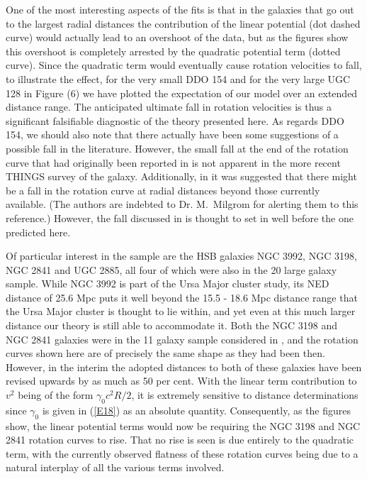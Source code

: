 \documentclass[preprint,aps]{revtex4}
\begin{document}
One of the most interesting aspects  of the fits is that in the galaxies that go out to the largest radial distances the contribution of the linear potential (dot dashed curve) would actually lead to an overshoot of the data, but as the figures show this overshoot is completely arrested by the quadratic potential term (dotted curve). Since the quadratic term would eventually cause rotation velocities to fall, to illustrate the effect, for the very small DDO 154 and for the very large UGC 128  in Figure (6) we have plotted the expectation of our model over an extended distance range. The anticipated ultimate fall in rotation velocities is thus a significant falsifiable diagnostic of the theory presented here. As regards DDO 154, we should also note that there actually have been some suggestions of a possible fall in the literature. However, the small fall at the end of the rotation curve that had originally been reported in \cite{Carignan1989} is not apparent in the more recent THINGS survey of the galaxy. Additionally, in \cite{Hoffman1993} it was suggested that there might  be a fall in the rotation curve at radial distances beyond those currently available. (The authors are indebted to Dr. M.~Milgrom for alerting them to this reference.)  However, the fall discussed in \cite{Hoffman1993} is thought to set in well before the one predicted here.

Of particular interest in the sample are the HSB galaxies NGC 3992, NGC 3198, NGC 2841 and UGC 2885, all four of which were also in the 20 large galaxy sample. While NGC 3992 is part of the Ursa Major cluster study, its NED distance of 25.6 Mpc puts it well beyond the 15.5 - 18.6 Mpc distance range that the Ursa Major cluster is thought to lie within, and yet even at this much larger distance our theory is still able to accommodate it. Both  the NGC 3198 and NGC 2841 galaxies were in the 11 galaxy sample considered in \cite{Mannheim1997}, and the rotation curves shown here are of precisely the same shape as they had been then. However, in the interim the adopted distances to both of these galaxies have been revised upwards by as much as 50 per cent.  With the linear term contribution to $v^2$ being of the form $\gamma_0 c^2R/2$, it is extremely sensitive to distance determinations since $\gamma_0$ is given in (\ref{E18}) as an absolute quantity. Consequently, as the figures show, the linear potential terms would now be requiring the NGC 3198 and NGC 2841 rotation curves to rise. That no rise is seen is due entirely to the quadratic term, with the currently observed flatness of these rotation curves being due to a natural interplay of all the various terms involved. 
\end{document}
